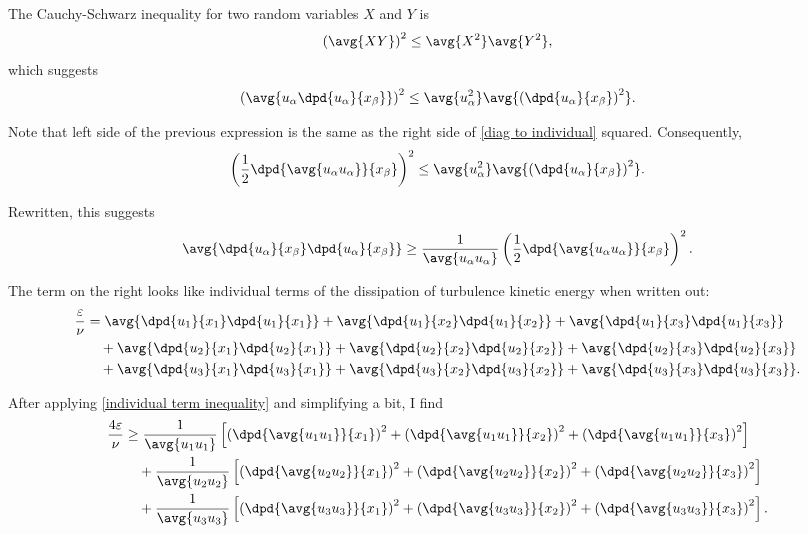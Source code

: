 \documentclass[ccbysa,note]{bmtreport}
\begin{document}
The Cauchy-Schwarz inequality for two random variables $X$ and $Y$ is
\begin{equation}
   \left(\avg{X Y}\right)^2 \leq \avg{X^2} \avg{Y^2},
\end{equation}
which suggests
\begin{equation}
   \left(\avg{u_\alpha \dpd{u_\alpha}{x_\beta}}\right)^2 \leq \avg{u_\alpha^2} \avg{\left(\dpd{u_\alpha}{x_\beta}\right)^2}.
\end{equation}

Note that left side of the previous expression is the same as the right side of \eqref{diag to individual} squared. Consequently,
\begin{equation}
   \left(\frac{1}{2} \dpd{\avg{u_\alpha u_\alpha}}{x_\beta}\right)^2 \leq \avg{u_\alpha^2} \avg{\left(\dpd{u_\alpha}{x_\beta}\right)^2}.
\end{equation}

Rewritten, this suggests
\begin{equation}
   \avg{\dpd{u_\alpha}{x_\beta} \dpd{u_\alpha}{x_\beta}} \geq \frac{1}{\avg{u_\alpha u_\alpha}} \left(\frac{1}{2} \dpd{\avg{u_\alpha u_\alpha}}{x_\beta}\right)^2. \label{eq:individual term inequality}
\end{equation}

The term on the right looks like individual terms of the dissipation of turbulence kinetic energy when written out:
\begin{align}
   \frac{\varepsilon}{\nu} &= \avg{\dpd{u_1}{x_1} \dpd{u_1}{x_1}} + \avg{\dpd{u_1}{x_2} \dpd{u_1}{x_2}} + \avg{\dpd{u_1}{x_3} \dpd{u_1}{x_3}} \notag \\
                           &\quad + \avg{\dpd{u_2}{x_1} \dpd{u_2}{x_1}} + \avg{\dpd{u_2}{x_2} \dpd{u_2}{x_2}} + \avg{\dpd{u_2}{x_3} \dpd{u_2}{x_3}} \notag \\
                           &\quad + \avg{\dpd{u_3}{x_1} \dpd{u_3}{x_1}} + \avg{\dpd{u_3}{x_2} \dpd{u_3}{x_2}} + \avg{\dpd{u_3}{x_3} \dpd{u_3}{x_3}}.
\end{align}

After applying \eqref{individual term inequality} and simplifying a bit, I find
\begin{align}
   \frac{4 \varepsilon}{\nu} &\geq \frac{1}{\avg{u_1 u_1}} \left[\left(\dpd{\avg{u_1 u_1}}{x_1}\right)^2 + \left(\dpd{\avg{u_1 u_1}}{x_2}\right)^2 + \left(\dpd{\avg{u_1 u_1}}{x_3}\right)^2\right] \notag \\
                             &\quad + \frac{1}{\avg{u_2 u_2}} \left[\left(\dpd{\avg{u_2 u_2}}{x_1}\right)^2 + \left(\dpd{\avg{u_2 u_2}}{x_2}\right)^2 + \left(\dpd{\avg{u_2 u_2}}{x_3}\right)^2\right] \notag \\
                             &\quad + \frac{1}{\avg{u_3 u_3}} \left[\left(\dpd{\avg{u_3 u_3}}{x_1}\right)^2 + \left(\dpd{\avg{u_3 u_3}}{x_2}\right)^2 + \left(\dpd{\avg{u_3 u_3}}{x_3}\right)^2\right]. \label{eq:diagonal reynolds stress inequality}
\end{align}
\end{document}
